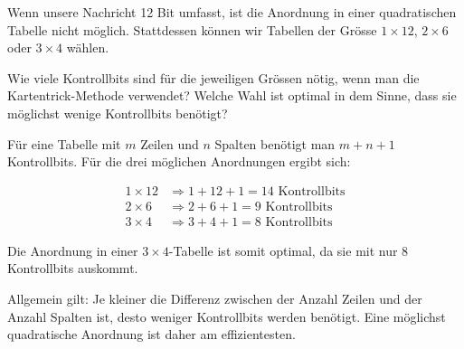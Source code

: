 \begin{myexercise}
	Wenn unsere Nachricht 12 Bit umfasst, ist die Anordnung in einer
	quadratischen Tabelle nicht möglich. Stattdessen können wir Tabellen
	der Grösse \(1\times 12\), \(2\times 6\) oder \(3\times 4\) wählen.

	Wie viele Kontrollbits sind für die jeweiligen Grössen nötig,
	wenn man die Kartentrick-Methode verwendet? Welche Wahl ist
	optimal in dem Sinne, dass sie möglichst wenige Kontrollbits benötigt?
	\begin{myanswer}
		Für eine Tabelle mit \(m\) Zeilen und \(n\) Spalten benötigt man
		\(m+n+1\) Kontrollbits. Für die drei möglichen Anordnungen ergibt sich:

		\begin{align*}
			1\times 12 & \Rightarrow 1+12+1 = 14 \text{ Kontrollbits} \\
			2\times 6  & \Rightarrow 2+6+1 = 9 \text{ Kontrollbits}   \\
			3\times 4  & \Rightarrow 3+4+1 = 8 \text{ Kontrollbits}
		\end{align*}

		Die Anordnung in einer \(3\times 4\)-Tabelle ist somit optimal,
		da sie mit nur 8 Kontrollbits auskommt.

		Allgemein gilt: Je kleiner die Differenz zwischen der Anzahl
		Zeilen und der Anzahl Spalten ist, desto weniger Kontrollbits
		werden benötigt. Eine möglichst quadratische Anordnung ist
		daher am effizientesten.
	\end{myanswer}
\end{myexercise}
